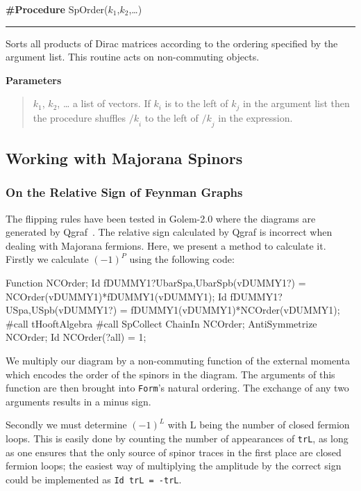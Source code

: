 \documentclass[preprint,number,12pt,sort&compress]{elsarticle}
\newcommand{\fmslash}[1]{\ensuremath{/\!\!\!{#1}}}
\newcommand{\kslash}[1][{}]{\fmslash{k}_{#1}}
\newcommand{\FORM}{{\texttt{Form}}}
\newlength{\funcindent}
\newlength{\funcwidth}
\newenvironment{Ventry}[1]%
 {\begin{list}{}{%
   \renewcommand{\makelabel}[1]{\texttt{##1:}\hfil}%
   \settowidth{\labelwidth}{\texttt{#1:}}%
   \setlength{\leftmargin}{\labelsep}%
   \addtolength{\leftmargin}{\labelwidth}}}%
 {\end{list}}
\newenvironment{Procedure}[2]{%
\hspace{.8\funcindent}\begin{boxedminipage}{\funcwidth}
	\raggedright \textbf{\#Procedure} #1(#2)

	\vspace{-1.5ex}

	\rule{\textwidth}{0.5\fboxrule}
	\setlength{\parskip}{2ex}
}{\end{boxedminipage}}
\newenvironment{Parameters}{%
	\setlength{\parskip}{1ex}
	\textbf{Parameters}
	\vspace{-1ex}
	\begin{quote}}{%
	\end{quote}}
\begin{document}
\medskip
\begin{Procedure}{SpOrder}{$k_1$,$k_2$,\dots}
   Sorts all products of Dirac matrices according to the
	ordering specified by the argument list. This routine
	acts on non-commuting objects.

	\begin{Parameters}
		\begin{Ventry}{$k_1$, $k_2$}
			\item[$k_1$, $k_2$, \dots] a list of vectors.
			If $k_i$ is to the left of $k_j$ in the argument list
			then the procedure shuffles $\kslash[i]$ to the left
			of $\kslash[j]$ in the expression.
		\end{Ventry}
	\end{Parameters}
\end{Procedure}

\subsection{Working with Majorana Spinors}

\subsubsection{On the Relative Sign of Feynman Graphs}

The flipping rules have been tested in Golem-2{.}0
where the diagrams are generated by Qgraf~\cite{Nogueira:1991ex}. 
The relative sign calculated by Qgraf is incorrect when dealing with Majorana fermions. 
Here, we present a method to calculate it. Firstly we
calculate $(-1)^{P}$ using the following code:

\begin{form}
Function NCOrder;
Id fDUMMY1?{UbarSpa,UbarSpb}(vDUMMY1?) =
      NCOrder(vDUMMY1)*fDUMMY1(vDUMMY1);
Id fDUMMY1?{USpa,USpb}(vDUMMY1?) =
      fDUMMY1(vDUMMY1)*NCOrder(vDUMMY1);
#call tHooftAlgebra
#call SpCollect
ChainIn NCOrder;
AntiSymmetrize NCOrder;
Id NCOrder(?all) = 1;
\end{form}

We multiply our diagram by a non-commuting function of the external momenta which encodes the order
of the spinors in the diagram.
The arguments of this function are then
brought into \FORM's natural ordering. 
The exchange of any two arguments results in a minus sign.

Secondly we must determine $(-1)^{L}$ with L being the number of closed fermion
loops. This is easily done by counting the number of appearances of \texttt{trL},
as long as one ensures that the only source of spinor traces in the first
place are closed fermion loops; the easiest way of multiplying the
amplitude by the correct sign could be implemented as \texttt{Id trL = -trL}.
\end{document}

